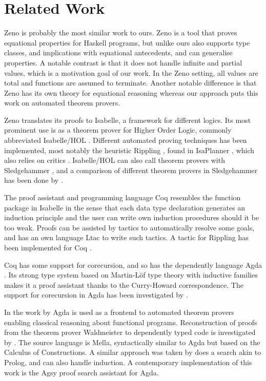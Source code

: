 \section{Related Work}

Zeno \citep{zeno} is probably the most similar work to ours. Zeno is a
tool that proves equational properties for Haskell programs, but
unlike ours also supports type classes, and implications with
equational antecedents, and can generalise properties. A notable
contrast is that it does not handle infinite and partial values, which
is a motivation goal of our work. In the Zeno setting, all values are
total and functions are assumed to terminate.  Another notable
difference is that Zeno has its own theory for equational reasoning
whereas our approach puts this work on automated theorem provers.


Zeno translates its proofs to Isabelle, a framework for different
logics. Its most prominent use is as a theorem prover for Higher Order
Logic, commonly abbreviated Isabelle/HOL \citep{isabelbook}. Different
automated proving techniques has been implemented, most notably the
heuristic Rippling \citep{dixonphd}, found in IsaPlanner
\citep{isaplanner}, which also relies on critics
\citep{productiveuse}. Isabelle/HOL can also call theorem provers with
Sledgehammer \citep{hammering}, and a comparison of different theorem
provers in Sledgehammer has been done by \cite{judgement}.

The proof assistant and programming language Coq resembles the
function package in Isabelle in the sense that each data type
declaration generates an induction principle and the user can write
own induction procedures should it be too weak. Proofs can be assisted
by tactics to automatically resolve some goals, and has an own
language Ltac to write such tactics. A tactic for Rippling has been
implemented for Coq \citep{inductioncoq}.

Coq has some support for corecursion, and so has the dependently
language Agda \citep{norell:thesis}. Its strong type system based on
Martin-Löf type theory \citep{mltt} with inductive families makes it a
proof assistant thanks to the Curry-Howard correspondence. The
support for corecursion in Agda has been investigated by \cite{productivity}.

In the work by \cite{agdaatp} Agda is used as a frontend to automated
theorem provers enabling classical reasoning about functional
programs. Reconstruction of proofs from the theorem prover Waldmeister
to dependently typed code is investigated by \cite{dtatp}. The source
language is Mella, syntactically similar to Agda but based on the
Calculus of Constructions. A similar approach was taken by \cite{agsy}
does a search akin to Prolog, and can also handle induction. A
contemporary implementation of this work is the Agsy proof search assistant
for Agda.

